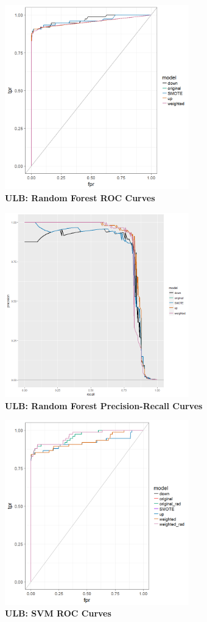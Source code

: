 \documentclass[12pt,]{article}
\begin{document}
\includegraphics[width=0.6\textwidth,height=\textheight]{figures/credit/cr_card_randfor_rocs.png}\\
\textbf{ULB: Random Forest ROC Curves}

\includegraphics[width=0.6\textwidth,height=\textheight]{figures/credit/cr_card_randfor_PR.png}\\
\textbf{ULB: Random Forest Precision-Recall Curves}

\includegraphics[width=0.6\textwidth,height=\textheight]{figures/credit/cr_card_svm_rocs.png}\\
\textbf{ULB: SVM ROC Curves}
\end{document}
